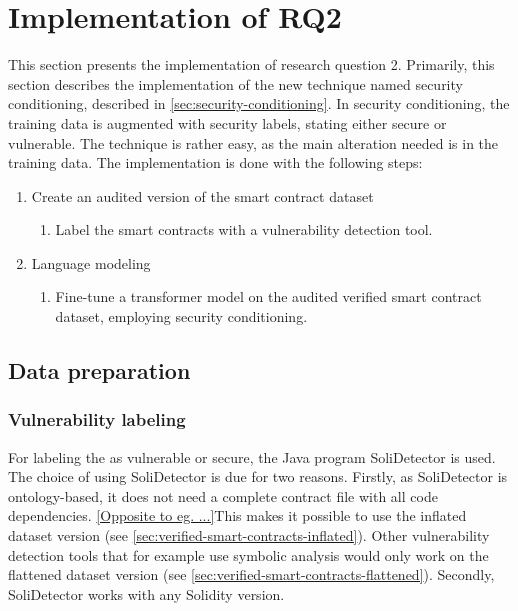 \FloatBarrier

\section{Implementation of RQ2}
This section presents the implementation of research question 2. Primarily, this section describes the implementation of the new technique named security conditioning, described in \cref{sec:security-conditioning}. In security conditioning, the training data is augmented with security labels, stating either secure or vulnerable. The technique is rather easy, as the main alteration needed is in the training data. The implementation is done with the following steps:
\begin{enumerate}
    \item Create an audited version of the smart contract dataset
    \begin{enumerate}
        \item Label the smart contracts with a vulnerability detection tool.
    \end{enumerate}
    \item Language modeling
    \begin{enumerate}
        \item Fine-tune a transformer model on the audited verified smart contract dataset, employing security conditioning.
    \end{enumerate}
\end{enumerate}

\subsection{Data preparation}
\label{sec:data-preparation}

\subsubsection{Vulnerability labeling}
\label{sec:vulnerability-labeling}
For labeling the  as vulnerable or secure, the Java program SoliDetector is used. The choice of using SoliDetector is due for two reasons. Firstly, as SoliDetector is ontology-based, it does not need a complete contract file with all code dependencies. \cref{Opposite to eg. ...}This makes it possible to use the inflated dataset version (see \cref{sec:verified-smart-contracts-inflated}). Other vulnerability detection tools that for example use symbolic analysis would only work on the flattened dataset version (see \cref{sec:verified-smart-contracts-flattened}). Secondly, SoliDetector works with any Solidity version. 

